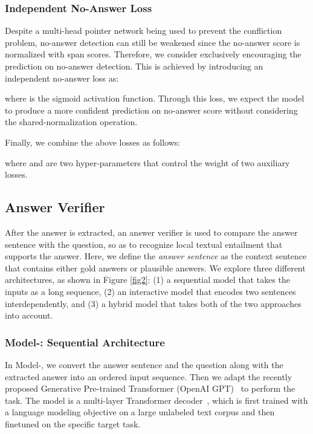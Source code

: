 \documentclass[letterpaper]{article} \usepackage{aaai19}  \usepackage{times}  \usepackage{helvet}  \usepackage{courier}  \usepackage{url}  \usepackage{graphicx}  \usepackage{pbox}
\begin{document}
\subsubsection{Independent No-Answer Loss}
Despite a multi-head pointer network being used to prevent the confliction problem, no-answer detection can still be weakened since the no-answer score  is normalized with span scores.
Therefore, we consider exclusively encouraging the prediction on no-answer detection.
This is achieved by introducing an independent no-answer loss as:

where  is the sigmoid activation function. 
Through this loss, we expect the model to produce a more confident prediction on no-answer score  without considering the shared-normalization operation.

Finally, we combine the above losses as follows:

where  and  are two hyper-parameters that control the weight of two auxiliary losses.


\subsection{Answer Verifier}
After the answer is extracted, an answer verifier is used to compare the answer sentence with the question, so as to recognize local textual entailment that supports the answer.
Here, we define the \emph{answer sentence} as the context sentence that contains either gold answers or plausible answers.
We explore three different architectures, as shown in Figure \ref{fig2}: 
(1) a sequential model that takes the inputs as a long sequence, (2) an interactive model that encodes two sentences interdependently, and (3) a hybrid model that takes both of the two approaches into account.

\subsubsection{Model-\uppercase\expandafter{}: Sequential Architecture}
In Model-\uppercase\expandafter{}, we convert the answer sentence and the question along with the extracted answer into an ordered input sequence. 
Then we adapt the recently proposed Generative Pre-trained Transformer (OpenAI GPT)~\cite{Radford18} to perform the task. 
The model is a multi-layer Transformer decoder~\cite{Liu18}, which is first trained with a language modeling objective on a large unlabeled text corpus and then finetuned on the specific target task.
\end{document}
